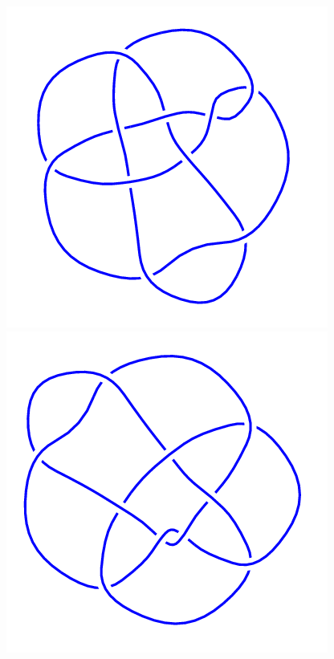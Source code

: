 \begin{figure}[H]
    \begin{minipage}[b]{.18\linewidth}
        \centering
        \includegraphics[width=\linewidth]{../data/10_117.png}
    \end{minipage}
    \begin{minipage}[b]{.18\linewidth}
        \centering
        \includegraphics[width=\linewidth]{../data/10_118.png}

\end{minipage}
\end{figure}
